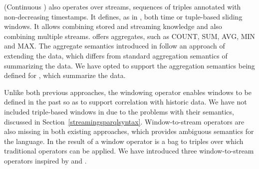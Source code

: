 \csparql (Continuous \sparql) \cite{Barbieri2010An-Execution-En} also operates over \rdf streams, sequences of triples annotated with non-decreasing timestamps. It defines, as in \streamingsparql, both time or tuple-based sliding windows.
It allows combining stored and streaming knowledge and also combining multiple streams. 
\csparql offers aggregates, such as \textsf{COUNT, SUM, AVG, MIN} and \textsf{MAX}. 
The aggregate semantics introduced in \csparql follow an approach of extending the data, which differs from standard aggregation semantics of summarizing the data. We have opted to support the aggregation semantics being defined for  \cite{Harris2010SPARQL-1.1-Quer}, which summarize the data.


Unlike both previous approaches, the \sparqlstr windowing operator enables windows to be defined in the past so as to support correlation with historic data. 
We have not included triple-based windows in \sparqlstr due to the problems with their semantics, discussed in Section~\ref{streamingsparqlsyntax}.
Window-to-stream operators are also missing in both existing approaches, which provides ambiguous semantics for the language.
In \sparqlstr the result of a window operator is a bag to triples over which traditional operators can be applied.
We have introduced three window-to-stream operators inspired by \sneeql and \cql.




